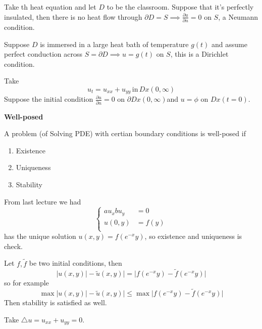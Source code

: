 	\begin{example}
		Take th heat equation and let $D$ to be the classroom. Suppose that it's perfectly insulated, then there is no heat flow through $\partial D = S \implies \frac{\partial u}{\partial n} = 0 $ on $S$, a Neumann condition. 
	\end{example}
	\begin{example}
		Suppose $D$ is immersed in a large heat bath of temperature $g(t)$ and assume perfect conduction across $S = \partial D \implies u = g(t)$ on $S$, this is a Dirichlet condition.
	\end{example}
	\begin{example}
		Take 
		\[ u_{t} = u_{xx} + u_{yy} \, \mathrm{in}\, Dx(0, \infty)\]
		Suppose the initial condition $\frac{\partial u}{\partial n} = 0$ on $\partial Dx(0, \infty)$and $ u = \phi$ on $Dx(t = 0)$.
	\end{example}
\textbf{Well-posed}
\begin{definition}[informal]
	A problem (of Solving PDE) with certian boundary conditions is well-posed if
	\begin{enumerate}
		\item Existence
		\item Uniqueness
		\item Stability
	\end{enumerate}
\end{definition}
\begin{example}
	From last lecture we had
	\[ \left\{ \begin{array}{rl} 
		a u_{x} b u_{y}  &= 0  \\
		u(0,y) &= f(y)  \\
	\end{array} \right. \]
	has the unique solution $u(x,y) = f \left( e^{-x}y \right)$, so existence and uniqueness is check.

	Let $f, \tilde f$ be two initial conditions, then 
	\[ |u(x,y)| - \tilde u(x,y)|  = |f\left(e^{-x}y\right) - \tilde f \left( e^{-x} y \right)|\]
	so for example
	\[ \max|u(x,y)| - \tilde u(x,y)|  \leq \max|f\left(e^{-x}y\right) - \tilde f \left( e^{-x} y \right)|\]
	Then stability is satisfied as well.
\end{example}
\begin{example}
	Take $\triangle u = u_{xx} + u_{yy} = 0$.

\end{example}


